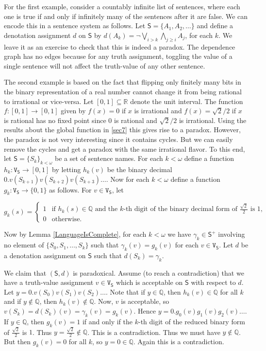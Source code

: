 \documentclass[12pt]{kluwer}
\theoremstyle{remark}
\def\S{\textsf{S}}
\def\V{\texttt{V}}
\begin{document}
For the first example, consider a countably infinite list of sentences, where each one is true if and only if infinitely many of the sentences after it are false. We can encode this in a sentence system as follows.  Let $\S=\{A_1, A_2,\dots\}$ and define a denotation assignment $d$ on $\S$ by $d(A_k)=\neg\bigvee_{i>k}\bigwedge_{j\geq i} A_j$, for each $k$. We leave it as an exercise to check that this is indeed a paradox. The dependence graph has no edges because for any truth assignment, toggling the value of a single sentence will not affect the truth-value of any other sentence.

The second example is based on the fact that flipping only finitely many bits in the binary representation of a real number cannot change it from being rational to irrational or vice-versa. Let $[0,1] \subseteq \mathbb{R}$ denote the unit interval. The function $f:[0,1] \rightarrow [0,1]$ given by $f(x) = 0$ if $x$ is irrational and $f(x) = \sqrt{2}/2$ if $x$ is rational has no fixed point since $0$ is rational and $\sqrt{2}/2$ is irrational.  Using the results about the global function in \autoref{sec7} this gives rise to a paradox.  However, the paradox is not very interesting since it contains cycles.  But we can easily remove the cycles and get a paradox with the same irrational flavor. To this end, let $\S = \{S_k\}_{k < \omega}$ be a set of sentence names.   For each $k < \omega$ define a function $h_k:\V_\S \rightarrow [0,1]$ by letting $h_k(v)$ be the binary decimal $0.v(S_{k+1})v(S_{k+2})v(S_{k+3})\ldots$.  Now for each $k < \omega$ define a function $g_k:\V_\S \rightarrow \{0, 1\}$ as follows. For $v \in \V_\S$, let 

\[g_k(s) = \begin{cases}
1 & \text{if } h_k(s) \in \mathbb{Q} \text{ and the $k$-th digit of the binary decimal form of $\frac{\sqrt{2}}{2}$ is $1$,}\\
0 & \text{otherwise}.
\end{cases}\]

Now by Lemma \ref{LanguageIsComplete}, for each $k < \omega$ we have $\gamma_k \in \S^+$ involving no element of $\{S_{0}, S_{1}, \ldots, S_{k}\}$ such that $\gamma_k(v) = g_k(v)$ for each $v \in \V_\S$.  Let $d$ be a denotation assignment on $\S$ such that $d(S_k) = \gamma_k$.

We claim that $(\S, d)$ is paradoxical.  Assume (to reach a contradiction) that we have a truth-value assignment $v \in \V_\S$ which is acceptable on $\S$ with respect to $d$. Let $y = 0.v(S_{0})v(S_{1})v(S_{2})\ldots$. Note that if $y \in \mathbb{Q}$, then $h_k(v) \in \mathbb{Q}$ for all $k$ and if $y \not \in \mathbb{Q}$, then $h_k(v) \not \in \mathbb{Q}$.  Now, $v$ is acceptable, so $v(S_k) = d(S_k)(v) = \gamma_k(v) = g_k(v)$.  Hence $y = 0.g_0(v)g_1(v)g_2(v)\ldots$.  If $y \in \mathbb{Q}$, then $g_k(v) = 1$ if and only if the $k$-th digit of the reduced binary form of $\frac{\sqrt{2}}{2}$ is $1$.  Thus $y = \frac{\sqrt{2}}{2} \not \in \mathbb{Q}$.  This is a contradiction.  Thus we must have $y \not \in \mathbb{Q}$.  But then $g_k(v) = 0$ for all $k$, so $y = 0 \in \mathbb{Q}$.  Again this is a contradiction.
\end{document}

